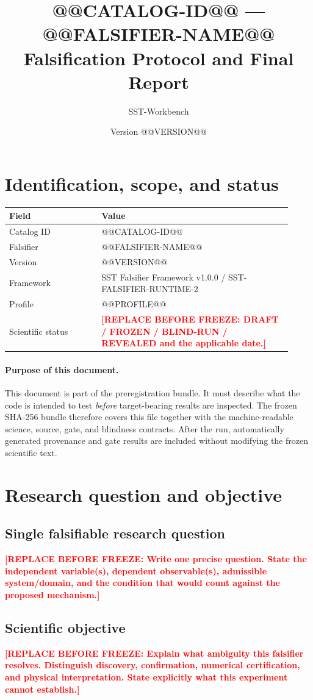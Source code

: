 \documentclass[11pt,a4paper]{article}
\title{@@CATALOG-ID@@ --- @@FALSIFIER-NAME@@\\Falsification Protocol and Final Report}
\author{SST-Workbench}
\date{Version @@VERSION@@}
\newcommand{\SSTTODO}[1]{\ifmmode\text{\color{red}\bfseries TODO}\else\textcolor{red}{\textbf{[REPLACE BEFORE FREEZE: #1]}}\fi}
\begin{document}
\maketitle

\section{Identification, scope, and status}
\begin{longtable}{p{0.30\linewidth}p{0.62\linewidth}}
\toprule
Field & Value \\
\midrule
Catalog ID & @@CATALOG-ID@@ \\
Falsifier & @@FALSIFIER-NAME@@ \\
Version & @@VERSION@@ \\
Framework & SST Falsifier Framework v1.0.0 / SST-FALSIFIER-RUNTIME-2 \\
Profile & @@PROFILE@@ \\
Scientific status & \SSTTODO{DRAFT / FROZEN / BLIND-RUN / REVEALED and the applicable date.} \\
\bottomrule
\end{longtable}

\paragraph{Purpose of this document.}
This document is part of the preregistration bundle. It must describe what the code is intended to test \emph{before} target-bearing results are inspected. The frozen SHA-256 bundle therefore covers this file together with the machine-readable science, source, gate, and blindness contracts. After the run, automatically generated provenance and gate results are included without modifying the frozen scientific text.

\section{Research question and objective}
\subsection{Single falsifiable research question}
\SSTTODO{Write one precise question. State the independent variable(s), dependent observable(s), admissible system/domain, and the condition that would count against the proposed mechanism.}

\subsection{Scientific objective}
\SSTTODO{Explain what ambiguity this falsifier resolves. Distinguish discovery, confirmation, numerical certification, and physical interpretation. State explicitly what this experiment cannot establish.}
\end{document}
